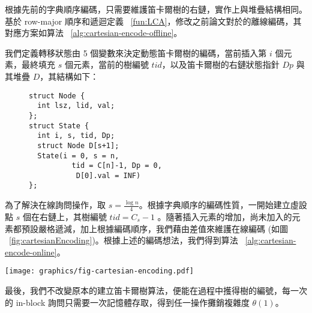 

根據先前的字典順序編碼，只需要維護笛卡爾樹的右鏈，實作上與堆疊結構相同。基於 row-major 順序和遞迴定義 ~\ref{fun:LCA}，修改之前論文對於的離線編碼，其對應方案如算法 ~\ref{alg:cartesian-encode-offline}。



我們定義轉移狀態由 5 個變數來決定動態笛卡爾樹的編碼，當前插入第 $i$ 個元素，最終填充 $s$ 個元素，當前的樹編號 $\mathit{tid}$，以及笛卡爾樹的右鏈狀態指針 $Dp$ 與其堆疊 $D$，其結構如下：

\begin{figure}[!thb]
  \begin{lstlisting}[frame=single,caption=State of Cartesian Tree]
struct Node {
  int lsz, lid, val;
};
struct State {
  int i, s, tid, Dp;
  struct Node D[s+1];
  State(i = 0, s = n, 
          tid = C[n]-1, Dp = 0,
           D[0].val = INF)
};
  \end{lstlisting}
\end{figure}

為了解決在線詢問操作，取 $s = \frac{\log n}{4}$。根據字典順序的編碼性質，一開始建立虛設點 $s$ 個在右鏈上，其樹編號 $\mathit{tid} = C_s - 1$ 。隨著插入元素的增加，尚未加入的元素都預設嚴格遞減，加上根據編碼順序，我們藉由差值來維護在線編碼 (如圖 ~\ref{fig:cartesianEncoding})。根據上述的編碼想法，我們得到算法 ~\ref{alg:cartesian-encode-online}。



\begin{figure*}[!thb]
  \centering
  \texttt{[image: graphics/fig-cartesian-encoding.pdf]}
  \caption{每個區塊有 $s$ 個元素，初始情況虛設 $s$ 個點在右鏈，則具有 $s$ 個節點的 BST，其編號 $\text{tid}_0 = C_s - 1$。當插入第 $i$ 個元素時，當前編號為 $\text{tid}_i$，以節點 $A$ 為根的樹編號為 $A.\text{tid}$，若第 $i+1$ 個元素值為 $x$，其將會翻轉到 $A$ 之上，而 $A$ 成為 $x$ 的左子節點，翻轉過程中計算得到 $A.\text{tid}$，而以 $x$ 為根的樹將虛設 $s-(i+1)$ 個節點在其右鏈，最後得到 $x.\text{tid}$。根據字典順序，我們將得到 $\text{tid}_{i+1} = \text{tid}_{i} + (x.\text{tid} - A.\text{tid})$。}
  \label{fig:cartesianEncoding}
\end{figure*}

最後，我們不改變原本的建立笛卡爾樹算法，便能在過程中擭得樹的編號，每一次的 in-block 詢問只需要一次記憶體存取，得到任一操作攤銷複雜度 $\theta(1)$。